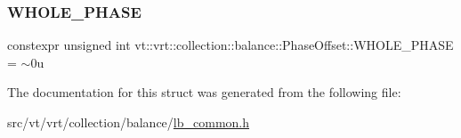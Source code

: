\subsubsection{\texorpdfstring{W\+H\+O\+L\+E\+\_\+\+P\+H\+A\+SE}{WHOLE\_PHASE}}
{\footnotesize\ttfamily constexpr unsigned int vt\+::vrt\+::collection\+::balance\+::\+Phase\+Offset\+::\+W\+H\+O\+L\+E\+\_\+\+P\+H\+A\+SE = $\sim$0u\hspace{0.3cm}{\ttfamily [static]}}



The documentation for this struct was generated from the following file\+:\begin{DoxyCompactItemize}
\item 
src/vt/vrt/collection/balance/\hyperlink{lb__common_8h}{lb\+\_\+common.\+h}\end{DoxyCompactItemize}
